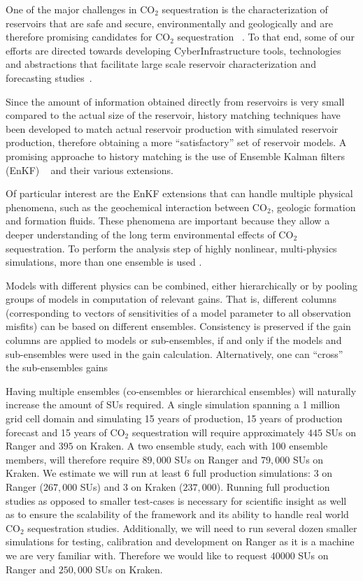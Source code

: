 \documentclass[a4paper,10pt]{article}
\begin{document}
One of the major challenges in CO$_2$ sequestration is the characterization of reservoirs that are 
safe and secure, environmentally and geologically and are therefore promising candidates for CO$_2$ 
sequestration ~\cite{GeoRPT,Luigi,Pruess2004,Pawar}. To that end, some of our efforts are directed towards 
developing CyberInfrastructure tools, technologies and abstractions that facilitate large scale 
reservoir characterization and forecasting studies~\cite{gmac,Elkhamra2009,MSEScience,TG10yye00}.

Since the amount of information obtained directly from reservoirs is very small compared to the 
actual size of the reservoir, history matching techniques have been developed to match actual 
reservoir production with simulated reservoir production, therefore obtaining a more 
``satisfactory'' set of reservoir models. A promising approache to history matching is 
the use of Ensemble Kalman filters (EnKF) ~\cite{KalmanPaper, DO2007, LiEnKF07, DO2006,Burger98}
and their various extensions.

Of particular interest are the EnKF extensions that can handle multiple physical phenomena,
such as the geochemical interaction between CO$_2$, geologic formation and formation fluids.
These phenomena are important because they allow a deeper understanding
of the long term environmental effects of CO$_2$ sequestration. To perform the analysis
step of highly nonlinear, multi-physics simulations, more than one ensemble is used 
\cite{Zhang,White1987,Durlofsky1992,Ballin1993,Gilks96,vanLeeuwen2003}.

Models with different physics can be combined, either hierarchically or by pooling 
groups of models in computation of relevant gains. That is, different  columns (corresponding to  
vectors of sensitivities of a model parameter to all observation misfits) can be based on different 
ensembles. Consistency is preserved if the gain columns are applied to models or sub-ensembles,
if and only if the models and sub-ensembles were used in the gain calculation. Alternatively, one 
can ``cross''  the sub-ensembles gains \cite{Mitchell02,Anderson2007,Michalak2003}

Having multiple ensembles (co-ensembles or hierarchical ensembles) will naturally increase the
amount of SUs required. A single simulation spanning a 1 million grid cell domain and simulating
15 years of production, 15 years of production forecast and 15 years of CO$_2$ sequestration will
require approximately $445$ SUs on Ranger and $395$ on Kraken. A two ensemble study, each with 100 ensemble members, 
will therefore require $89,000$ SUs on Ranger and $79,000$ SUs on Kraken. We estimate we will run 
at least $6$ full production 
simulations: $3$ on Ranger ($267,000$ SUs)  and $3$ on Kraken ($237,000$). Running
full production studies as opposed to smaller test-cases is necessary for scientific insight as 
well as to ensure the scalability of 
the framework and its ability to handle real world CO$_2$ sequestration studies. Additionally, we 
will need to run several dozen smaller simulations for testing, calibration and development on 
Ranger as it is a machine we are very familiar with. Therefore we would like to request $40000$ SUs 
on Ranger and $250,000$ SUs on Kraken.
\end{document}
